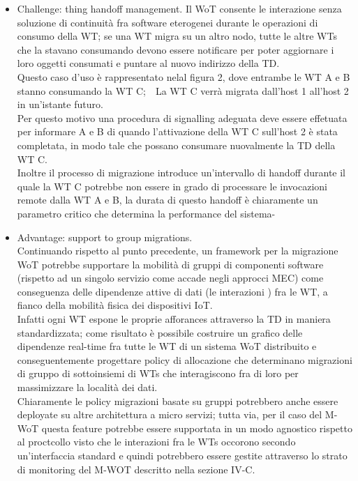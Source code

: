 \documentclass[11pt]{article}
\begin{document}
	\begin{itemize}
		\item Challenge: thing handoff management. Il WoT consente le interazione senza soluzione di continuità fra software eterogenei durante le operazioni di consumo della WT; se una WT migra su un altro nodo, tutte le altre WTs che la stavano consumando devono essere notificare per poter aggiornare i loro oggetti consumati e puntare al nuovo indirizzo della TD. \\
		Questo caso d'uso è rappresentato nelal figura 2, dove entrambe le WT A e B stanno consumando la WT C;\ \
		La WT C verrà migrata dall'host 1 all'host 2 in un'istante futuro. \\
		Per questo motivo una procedura di signalling adeguata deve essere effetuata per informare A e B di quando l'attivazione della WT C sull'host 2 è stata completata, in modo tale che possano consumare nuovalmente la TD della WT C. \\
		Inoltre il processo di migrazione introduce un'intervallo di handoff durante il quale la WT C potrebbe non essere in grado di processare le invocazioni remote dalla WT A e B, la durata di questo handoff è chiaramente un parametro critico che determina la performance del sistema-
		\item Advantage: support to group migrations.\\
		Continuando rispetto al punto precedente, un framework per la migrazione WoT potrebbe supportare la mobilità di gruppi di componenti software (rispetto ad un singolo servizio come accade negli approcci MEC) come conseguenza delle dipendenze attive di dati (le interazioni ) fra le WT, a fianco della mobilità fisica dei dispositivi IoT. \\
		Infatti ogni WT espone le proprie afforances attraverso la TD in maniera standardizzata; come risultato è possibile costruire un grafico delle dipendenze real-time fra tutte le WT di un sistema WoT distribuito e conseguentemente progettare policy di allocazione che determinano migrazioni di gruppo di sottoinsiemi di WTs che interagiscono fra di loro per massimizzare la località dei dati. \\
		Chiaramente le policy migrazioni basate su gruppi potrebbero anche essere deployate su altre architettura a micro servizi; tutta via, per il caso del M-WoT questa feature potrebbe essere supportata in un modo agnostico rispetto al proctcollo visto che le interazioni fra le WTs occorono secondo un'interfaccia standard e quindi potrebbero essere gestite attraverso lo strato di monitoring del M-WOT descritto nella sezione IV-C.
	\end{itemize}	
			
\end{document}
